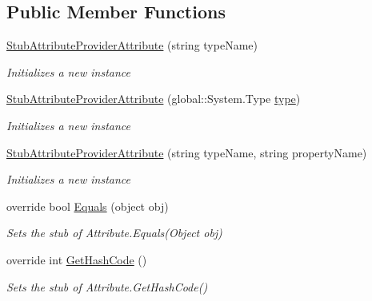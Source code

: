 \subsection*{Public Member Functions}
\begin{DoxyCompactItemize}
\item 
\hyperlink{class_system_1_1_component_model_1_1_fakes_1_1_stub_attribute_provider_attribute_a3131b2db1575ee5bf91c51f2c531ad98}{Stub\-Attribute\-Provider\-Attribute} (string type\-Name)
\begin{DoxyCompactList}\small\item\em Initializes a new instance\end{DoxyCompactList}\item 
\hyperlink{class_system_1_1_component_model_1_1_fakes_1_1_stub_attribute_provider_attribute_ac4ebe0941553d46d5ed3ed3f65fa13c5}{Stub\-Attribute\-Provider\-Attribute} (global\-::\-System.\-Type \hyperlink{jquery-1_810_82-vsdoc_8js_a3940565e83a9bfd10d95ffd27536da91}{type})
\begin{DoxyCompactList}\small\item\em Initializes a new instance\end{DoxyCompactList}\item 
\hyperlink{class_system_1_1_component_model_1_1_fakes_1_1_stub_attribute_provider_attribute_a55ef2e95a1dcc253b68293c3f9065b15}{Stub\-Attribute\-Provider\-Attribute} (string type\-Name, string property\-Name)
\begin{DoxyCompactList}\small\item\em Initializes a new instance\end{DoxyCompactList}\item 
override bool \hyperlink{class_system_1_1_component_model_1_1_fakes_1_1_stub_attribute_provider_attribute_a6869e8e271df56328d6bd319458c0f4d}{Equals} (object obj)
\begin{DoxyCompactList}\small\item\em Sets the stub of Attribute.\-Equals(\-Object obj)\end{DoxyCompactList}\item 
override int \hyperlink{class_system_1_1_component_model_1_1_fakes_1_1_stub_attribute_provider_attribute_a0732b48a526cf824398c30e87d76c308}{Get\-Hash\-Code} ()
\begin{DoxyCompactList}\small\item\em Sets the stub of Attribute.\-Get\-Hash\-Code()\end{DoxyCompactList}\item 

\end{DoxyCompactItemize}
